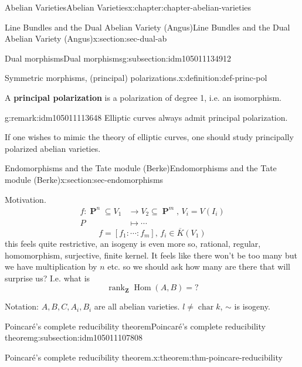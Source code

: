 \documentclass[oneside,10pt,]{book}
\newcommand{\terminology}[1]{\textbf{#1}}
\numberwithin{equation}{section}
\newcommand{\lb}{[}
\newcommand{\rb}{]}
\newcommand{\ZZ}{\mathbf{Z}}
\DeclareMathOperator{\Hom}{Hom}
\DeclareMathOperator{\rank}{rank}
\DeclareMathOperator{\characteristic}{char}
\DeclareMathOperator{\PP}{\mathbf{P}}
\newcommand{\amp}{&}
\begin{document}
\begin{chapterptx}{Abelian Varieties}{}{Abelian Varieties}{}{}{x:chapter:chapter-abelian-varieties}
\begin{sectionptx}{Line Bundles and the Dual Abelian Variety (Angus)}{}{Line Bundles and the Dual Abelian Variety (Angus)}{}{}{x:section:sec-dual-ab}
\begin{subsectionptx}{Dual morphisms}{}{Dual morphisms}{}{}{g:subsection:idm105011134912}
\begin{definition}{Symmetric morphisms, (principal) polarizations.}{x:definition:def-princ-pol}
\par
A \terminology{principal polarization} is a polarization of degree 1, i.e. an isomorphism.%
\end{definition}
\begin{remark}{}{g:remark:idm105011113648}%
Elliptic curves always admit principal polarization.%
\par
If one wishes to mimic the theory of elliptic curves, one should study principally polarized abelian varieties.%
\end{remark}
\end{subsectionptx}
\end{sectionptx}
%
%
\typeout{************************************************}
\typeout{************************************************}
%
\begin{sectionptx}{Endomorphisms and the Tate module (Berke)}{}{Endomorphisms and the Tate module (Berke)}{}{}{x:section:sec-endomorphisms}
\begin{introduction}{Motivation.}%
%
\begin{align*}
f \colon \PP^n\subseteq V_1 \amp\to V_2 \subseteq \PP^m,\,V_i = V(I_i)\\
P\amp \mapsto \cdots
\end{align*}
%
\begin{equation*}
f = \lb f_1 : \cdots : f_m\rb ,\,f_i\in \overline K (V_1)
\end{equation*}
this feels quite restrictive, an isogeny is even more so, rational, regular, homomorphism, surjective, finite kernel. It feels like there won't be too many but we have multiplication by \(n\) etc. so we should ask how many are there that will surprise us? I.e. what is%
\begin{equation*}
\rank_\ZZ \Hom(A,B) = ?
\end{equation*}
%
\par
Notation: \(A,B,C , A_i,  B_i\) are all abelian varieties. \(l \ne \characteristic k\), \(\sim\) is isogeny.%
\end{introduction}%
%
%
\typeout{************************************************}
\typeout{************************************************}
%
\begin{subsectionptx}{Poincaré's complete reducibility theorem}{}{Poincaré's complete reducibility theorem}{}{}{g:subsection:idm105011107808}
\begin{theorem}{Poincaré's complete reducibility theorem.}{}{x:theorem:thm-poincare-reducibility}%

\end{theorem}
\end{subsectionptx}
\end{sectionptx}
\end{chapterptx}
\end{document}
